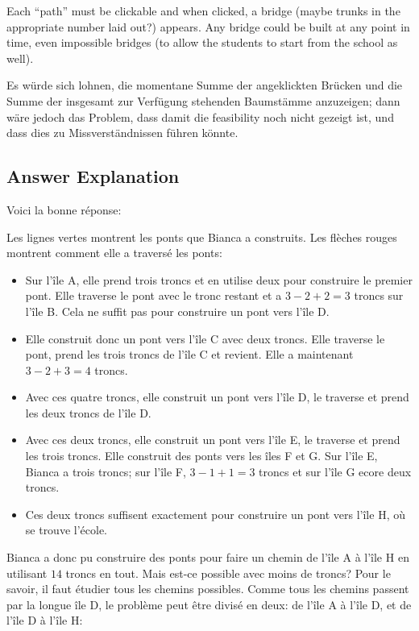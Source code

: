 \documentclass[a4paper,11pt]{report}
\newcommand{\taskGraphicsFolder}{..}
\begin{document}
Each “path” must be clickable and when clicked, a bridge (maybe trunks in the appropriate number laid out?) appears. Any bridge could be built at any point in time, even impossible bridges (to allow the students to start from the school as well).

Es würde sich lohnen, die momentane Summe der angeklickten Brücken und die Summe der insgesamt zur Verfügung stehenden Baumstämme anzuzeigen; dann wäre jedoch das Problem, dass damit die feasibility noch nicht gezeigt ist, und dass dies zu Missverständnissen führen könnte.

\endgroup

\subsection*{Answer Explanation}

Voici la bonne réponse:

{\centering%
\par}

Les lignes vertes montrent les ponts que Bianca a construits. Les flèches rouges montrent comment elle a traversé les ponts:

\begin{itemize}
  \item Sur l’île A, elle prend trois troncs et en utilise deux pour construire le premier pont. Elle traverse le pont avec le tronc restant et a ${3 - 2 + 2 = 3}$ troncs sur l’île B. Cela ne suffit pas pour construire un pont vers l’île D.
  \item Elle construit donc un pont vers l’île C avec deux troncs. Elle traverse le pont, prend les trois troncs de l’île C et revient. Elle a maintenant ${3 - 2 + 3 = 4}$ troncs.
  \item Avec ces quatre troncs, elle construit un pont vers l’île D, le traverse et prend les deux troncs de l’île D.
  \item Avec ces deux troncs, elle construit un pont vers l’île E, le traverse et prend les trois troncs. Elle construit des ponts vers les îles F et G. Sur l’île E, Bianca a trois troncs; sur l’île F, ${3 - 1 + 1 = 3}$ troncs et sur l’île G ecore deux troncs.
  \item Ces deux troncs suffisent exactement pour construire un pont vers l’île H, où se trouve l’école.
\end{itemize}

Bianca a donc pu construire des ponts pour faire un chemin de l’île A à l’île H en utilisant $14$ troncs en tout. Mais est-ce possible avec moins de troncs? Pour le savoir, il faut étudier tous les chemins possibles. Comme tous les chemins passent par la longue île D, le problème peut être divisé en deux: de l’île A à l’île D, et de l’île D à l’île H:
\end{document}
